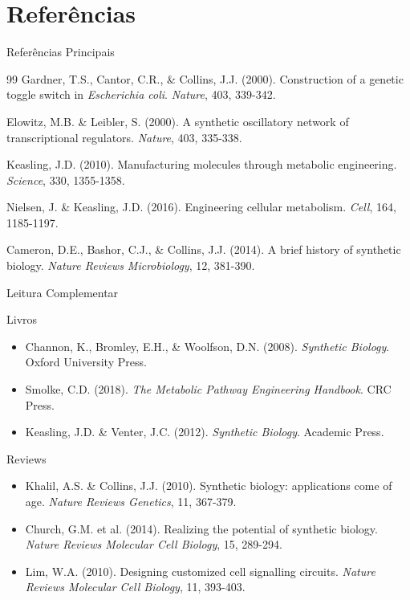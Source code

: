 \section{Referências}

\begin{frame}{Referências Principais}
\begin{thebibliography}{99}
 Gardner, T.S., Cantor, C.R., \& Collins, J.J. (2000). Construction of a genetic toggle switch in \textit{Escherichia coli}. \textit{Nature}, 403, 339-342.

 Elowitz, M.B. \& Leibler, S. (2000). A synthetic oscillatory network of transcriptional regulators. \textit{Nature}, 403, 335-338.

 Keasling, J.D. (2010). Manufacturing molecules through metabolic engineering. \textit{Science}, 330, 1355-1358.

 Nielsen, J. \& Keasling, J.D. (2016). Engineering cellular metabolism. \textit{Cell}, 164, 1185-1197.

 Cameron, D.E., Bashor, C.J., \& Collins, J.J. (2014). A brief history of synthetic biology. \textit{Nature Reviews Microbiology}, 12, 381-390.
\end{thebibliography}
\end{frame}

\begin{frame}{Leitura Complementar}
\begin{block}{Livros}
\begin{itemize}
    \item Channon, K., Bromley, E.H., \& Woolfson, D.N. (2008). \textit{Synthetic Biology}. Oxford University Press.
    \item Smolke, C.D. (2018). \textit{The Metabolic Pathway Engineering Handbook}. CRC Press.
    \item Keasling, J.D. \& Venter, J.C. (2012). \textit{Synthetic Biology}. Academic Press.
\end{itemize}
\end{block}

\begin{block}{Reviews}
\begin{itemize}
    \item Khalil, A.S. \& Collins, J.J. (2010). Synthetic biology: applications come of age. \textit{Nature Reviews Genetics}, 11, 367-379.
    \item Church, G.M. et al. (2014). Realizing the potential of synthetic biology. \textit{Nature Reviews Molecular Cell Biology}, 15, 289-294.
    \item Lim, W.A. (2010). Designing customized cell signalling circuits. \textit{Nature Reviews Molecular Cell Biology}, 11, 393-403.
\end{itemize}
\end{block}
\end{frame}

